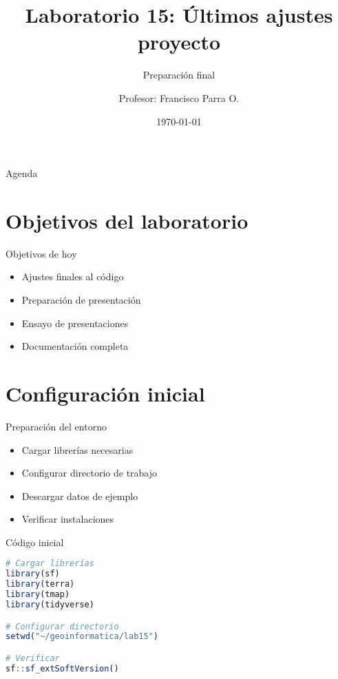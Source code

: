 \documentclass[10pt]{beamer}
\title{Laboratorio 15: Últimos ajustes proyecto}
\subtitle{Preparación final}
\author{Profesor: Francisco Parra O.}
\institute{USACH - Ingeniería Civil en Informática}
\date{\today}
\begin{document}
\maketitle

\begin{frame}{Agenda}
    \tableofcontents
\end{frame}


\section{Objetivos del laboratorio}

\begin{frame}{Objetivos de hoy}
    \begin{itemize}
        \item Ajustes finales al código
        \item Preparación de presentación
        \item Ensayo de presentaciones
        \item Documentación completa
    \end{itemize}
\end{frame}

\section{Configuración inicial}

\begin{frame}{Preparación del entorno}
    \begin{itemize}
        \item Cargar librerías necesarias
        \item Configurar directorio de trabajo
        \item Descargar datos de ejemplo
        \item Verificar instalaciones
    \end{itemize}
\end{frame}

\begin{frame}[fragile]{Código inicial}
    \begin{lstlisting}[language=R]
# Cargar librerías
library(sf)
library(terra)
library(tmap)
library(tidyverse)

# Configurar directorio
setwd("~/geoinformatica/lab15")

# Verificar
sf::sf_extSoftVersion()
    \end{lstlisting}
\end{frame}
\end{document}
